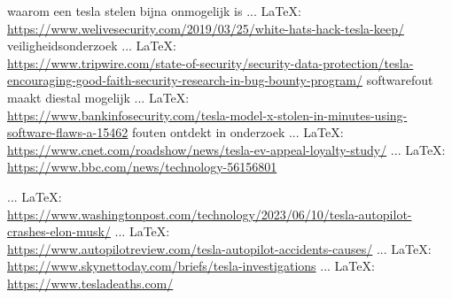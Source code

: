 \begin{thebibliography}{99}
{{{{				waarom een tesla stelen bijna onmogelijk is
				 ... \LaTeX:\\ \url{https://www.welivesecurity.com/2019/03/25/white-hats-hack-tesla-keep/}
				veiligheidsonderzoek
				 ... \LaTeX:\\ \url{https://www.tripwire.com/state-of-security/security-data-protection/tesla-encouraging-good-faith-security-research-in-bug-bounty-program/}
				softwarefout maakt diestal mogelijk
				 ... \LaTeX:\\ \url{https://www.bankinfosecurity.com/tesla-model-x-stolen-in-minutes-using-software-flaws-a-15462}
				fouten ontdekt in onderzoek
				 ... \LaTeX:\\ \url{https://www.cnet.com/roadshow/news/tesla-ev-appeal-loyalty-study/}
				 ... \LaTeX:\\ \url{https://www.bbc.com/news/technology-56156801}
				
				
				 ... \LaTeX:\\ \url{https://www.washingtonpost.com/technology/2023/06/10/tesla-autopilot-crashes-elon-musk/}
				 ... \LaTeX:\\ \url{https://www.autopilotreview.com/tesla-autopilot-accidents-causes/}
				 ... \LaTeX:\\ \url{https://www.skynettoday.com/briefs/tesla-investigations}
				 ... \LaTeX:\\ \url{https://www.tesladeaths.com/}
				
				
				
}}}}
\end{thebibliography}
